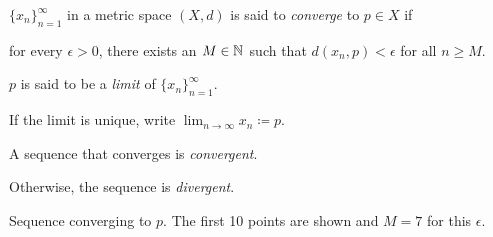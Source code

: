 \documentclass[10pt,aspectratio=169]{beamer}
\begin{document}
\begin{frame}

\begin{definition}
$\{ x_n \}_{n=1}^\infty$ in a metric space $(X,d)$ is said
to \emph{converge} to 
$p \in X$ if

for every $\epsilon > 0$, there exists an $M \in {\mathbb{N}}$ such
that $d(x_n,p) < \epsilon$ for all $n \geq M$.

\pause
\medskip

$p$
is said to be a \emph{limit}
of $\{ x_n \}_{n=1}^\infty$.

\pause
\medskip

If the limit is unique, write
\quad $\displaystyle
\lim_{n\to \infty} x_n \coloneqq p$.

\pause
\medskip

A sequence that converges is \emph{convergent}.

\pause
Otherwise, the sequence is \emph{divergent}.
\end{definition}

\pause
\medskip

\begin{center}
\end{center}

Sequence converging to $p$.  The first 10 points 
are shown and $M=7$ for this $\epsilon$.

\end{frame}
\end{document}
